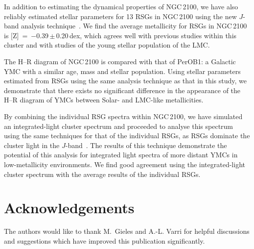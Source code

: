 \documentclass[useAMS,usenatbib]{mn2e}
\begin{document}
In addition to estimating the dynamical properties of NGC\,2100, we have also reliably estimated stellar parameters for 13 RSGs in NGC\,2100 using the new $J$-band analysis technique~\citep{2010MNRAS.407.1203D}.
We find the average metallicity for RSGs in NGC\,2100 is [Z]~=~$-$0.39\,$\pm$\,0.20\,dex, which agrees well with previous studies within this cluster and with studies of the young stellar population of the LMC.

The H--R diagram of NGC\,2100 is compared with that of PerOB1: a Galactic YMC with a similar age, mass and stellar population.
Using stellar parameters estimated from RSGs using the same analysis technique as that in this study, we demonstrate that there exists no significant difference in the appearance of the H--R diagram of YMCs between Solar- and LMC-like metallicities.


By combining the individual RSG spectra within NGC\,2100, we have simulated an integrated-light cluster spectrum and proceeded to analyse this spectrum using the same techniques for that of the individual RSGs, as RSGs dominate the cluster light in the $J$-band~\citep{2013MNRAS.430L..35G}.
The results of this technique demonstrate the potential of this analysis for integrated light spectra of more distant YMCs in low-metallicity environments.
We find good agreement using the integrated-light cluster spectrum with the average results of the individual RSGs.

\section*{Acknowledgements}
The authors would like to thank M.~Gieles and A.-L. Varri for helpful discussions and suggestions which have improved this publication significantly.


% 
\end{document}
